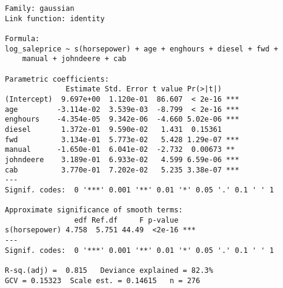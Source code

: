 \begin{verbatim}
Family: gaussian 
Link function: identity 

Formula:
log_saleprice ~ s(horsepower) + age + enghours + diesel + fwd + 
    manual + johndeere + cab

Parametric coefficients:
              Estimate Std. Error t value Pr(>|t|)    
(Intercept)  9.697e+00  1.120e-01  86.607  < 2e-16 ***
age         -3.114e-02  3.539e-03  -8.799  < 2e-16 ***
enghours    -4.354e-05  9.342e-06  -4.660 5.02e-06 ***
diesel       1.372e-01  9.590e-02   1.431  0.15361    
fwd          3.134e-01  5.773e-02   5.428 1.29e-07 ***
manual      -1.650e-01  6.041e-02  -2.732  0.00673 ** 
johndeere    3.189e-01  6.933e-02   4.599 6.59e-06 ***
cab          3.770e-01  7.202e-02   5.235 3.38e-07 ***
---
Signif. codes:  0 '***' 0.001 '**' 0.01 '*' 0.05 '.' 0.1 ' ' 1

Approximate significance of smooth terms:
                edf Ref.df     F p-value    
s(horsepower) 4.758  5.751 44.49  <2e-16 ***
---
Signif. codes:  0 '***' 0.001 '**' 0.01 '*' 0.05 '.' 0.1 ' ' 1

R-sq.(adj) =  0.815   Deviance explained = 82.3%
GCV = 0.15323  Scale est. = 0.14615   n = 276
\end{verbatim}